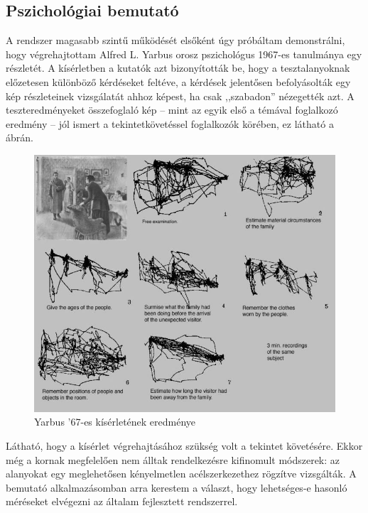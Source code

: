 \subsection{Pszichológiai bemutató}\label{sect:pszicho}

A rendszer magasabb szintű működését elsőként úgy próbáltam demonstrálni, hogy végrehajtottam Alfred L. Yarbus orosz pszichológus 1967-es tanulmánya egy részletét. A kísérletben a kutatók azt bizonyították be, hogy a tesztalanyoknak előzetesen különböző kérdéseket feltéve, a kérdések jelentősen befolyásolták egy kép részleteinek vizsgálatát ahhoz képest, ha csak ,,szabadon'' nézegették azt. A teszteredményeket összefoglaló kép -- mint az egyik első a témával foglalkozó eredmény -- jól ismert a tekintetkövetéssel foglalkozók körében, ez látható a  ábrán.

\begin{figure}[!ht]
\centering
\includegraphics[width=140mm, keepaspectratio]{figures/yarbus.jpg}
\caption{Yarbus '67-es kísérletének eredménye}
\label{fig:yarbus}
\end{figure}

Látható, hogy a kísérlet végrehajtásához szükség volt a tekintet követésére. Ekkor még a kornak megfelelően nem álltak rendelkezésre kifinomult módszerek: az alanyokat egy meglehetősen kényelmetlen acélszerkezethez rögzítve vizsgálták. A bemutató alkalmazásomban arra kerestem a választ, hogy lehetséges-e hasonló méréseket elvégezni az általam fejlesztett rendszerrel.

